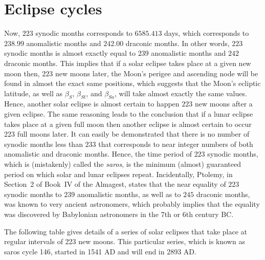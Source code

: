 \section{Eclipse cycles}
Now, $223$ synodic months corresponds to $6585.413$ days, which corresponds to $238.99$ anomalistic months and $242.00$ draconic months. In other words,
$223$ synodic months is almost exactly equal to $239$ anomalistic months and $242$ draconic months. 
This implies that if a solar eclipse takes place at a given new moon then, $223$ new moons later, the Moon's perigee and ascending node will be found in almost
the exact same positions, which 
 suggests that the Moon's ecliptic latitude, as well as $\beta_S$, $\beta_{St}$, and $\beta_{Sa}$, will take almost exactly the same values. Hence, another solar eclipse is almost
certain to happen $223$ new moons after a given eclipse. The same reasoning leads to the conclusion that if a lunar eclipse takes place at
a given full moon then another eclipse is almost certain to occur 223 full moons later. It can easily be demonstrated that there is no number of
synodic months less than $233$ that corresponds to near integer numbers of both anomalistic and draconic months. Hence, the time period
of $223$ synodic months, which is (mistakenly) called the {\em saros}, is the minimum (almost) guaranteed period on which solar and lunar eclipses repeat. 
Incidentally, Ptolemy, in Section~2 of Book~IV of the Almagest, states that the near equality of $223$ synodic months to $239$ anomalistic months, as well as to $245$
draconic months, was known to very ancient astronomers, which probably implies that the equality was discovered by  Babylonian astronomers in the 7th or 6th century BC. 

The following table gives details of a series of solar eclipses that take place at regular intervals of 223 new moons. This particular series, which is known as saros cycle 146, started in 1541 AD and will end in 2893 AD. 

